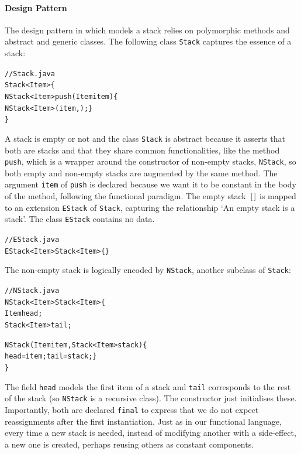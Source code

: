 \paragraph{Design Pattern}

The design pattern in \Java which models a stack  relies on polymorphic methods and abstract and generic
classes. The following class \texttt{Stack} captures the essence of a
stack:
\begin{alltt}
// Stack.java
\public \abstractX \class Stack<Item> \{
  \public \final NStack<Item> push(\final Item item) \{
    \return \new NStack<Item>(item,\this); \}
\}
\end{alltt}
A stack is empty or not and the class \texttt{Stack} is abstract
because it asserts that both are stacks and that they share common
functionalities, like the method \texttt{push}, which is a wrapper
around the constructor of non\hyp{}empty stacks, \texttt{NStack}, so
both empty and non\hyp{}empty stacks are augmented by the same
method. The argument \texttt{item} of \texttt{push} is declared
\final{} because we want it to be constant in the body of the method,
following the functional paradigm. The empty stack~\([\,]\) is mapped
to an extension \texttt{EStack} of \texttt{Stack}, capturing the
relationship `An empty stack is a stack'. The class \texttt{EStack}
contains no data.
\begin{alltt}
// EStack.java
\public \final \class EStack<Item> \extends Stack<Item> \{\}
\end{alltt}
The non\hyp{}empty stack is logically encoded by \texttt{NStack},
another subclass of \texttt{Stack}:
\begin{alltt}
// NStack.java
\public \final \class NStack<Item> \extends Stack<Item> \{
  \private \final Item head;
  \private \final Stack<Item> tail;

  \public NStack(\final Item item, \final Stack<Item> stack) \{
    head = item; tail = stack; \}
\}
\end{alltt}
The field \texttt{head} models the first item of a stack and
\texttt{tail} corresponds to the rest of the stack (so \texttt{NStack}
is a recursive class). The constructor just initialises
these. Importantly, both are declared \texttt{final} to express that
we do not expect reassignments after the first instantiation. Just as
in our functional language, every time a new stack is needed, instead
of modifying another with a side\hyp{}effect, a new one is created,
perhaps reusing others as constant components.

